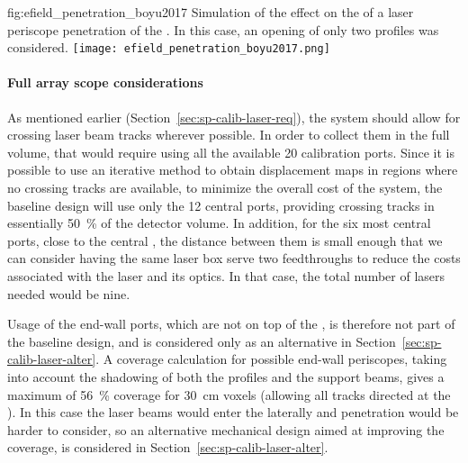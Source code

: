 \begin{dunefigure}{fig:efield_penetration_boyu2017}
{Simulation of the effect on the \efield of a laser periscope penetration of the . In this case, an opening of only two profiles was considered.}
\texttt{[image: efield\_penetration\_boyu2017.png]}
\end{dunefigure}


\paragraph{Full array scope considerations}

As mentioned earlier (Section~\ref{sec:sp-calib-laser-req}), the system should allow for crossing laser beam tracks wherever possible. In order to %
collect them in the full  volume, that would require using all the available \num{20} calibration ports. Since it is possible to use an iterative method to obtain displacement maps in regions where no crossing tracks are available, 
to minimize the overall cost of the system, the baseline design will use only the \num{12} central ports, providing crossing tracks in essentially \SI{50}{\%} of the detector volume. 
In addition, for the six most central ports, close to the central , the distance between them is small enough that we can consider having the same laser box serve two feedthroughs to reduce the costs associated with the laser and its optics. In that case, the total number of lasers needed would be nine.

Usage of the end-wall ports, which are not %
on top of the , is therefore not part of the baseline design, and is considered only as an alternative in Section~\ref{sec:sp-calib-laser-alter}. A coverage calculation for possible end-wall periscopes, taking into account the shadowing of both the  profiles and the support beams, gives a maximum of \SI{56}{\%} coverage for \SI{30}{\cm} voxels (allowing all tracks directed at the ). In this case the laser beams would enter the  laterally and  penetration would be harder to consider, so an alternative mechanical design aimed at improving the coverage, is considered in Section~\ref{sec:sp-calib-laser-alter}.



